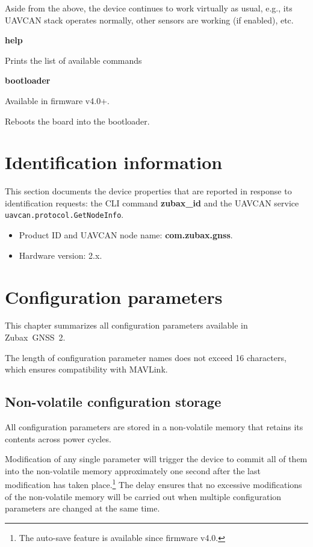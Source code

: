 \documentclass{zubaxdoc}
\begin{document}
Aside from the above, the device continues to work virtually as usual, e.g., its UAVCAN stack operates normally, other sensors are working (if enabled), etc.

\textbf{help}

Prints the list of available commands

\textbf{bootloader}

Available in firmware v4.0+.

Reboots the board into the bootloader.

\chapter{Identification information}

This section documents the device properties that are reported in response to identification requests: the CLI command \textbf{zubax{\_}id} and the UAVCAN service \texttt{uavcan.protocol.GetNodeInfo}.
\begin{itemize}
\item Product ID and UAVCAN node name: \textbf{com.zubax.gnss}.
\item Hardware version: 2.x.
\end{itemize}

\chapter{Configuration parameters}\label{sec:configuration_parameters}

This chapter summarizes all configuration parameters available in Zubax~GNSS~2.

The length of configuration parameter names does not exceed 16 characters,
which ensures compatibility with MAVLink.

\section{Non-volatile configuration storage}

All configuration parameters are stored in a non-volatile memory
that retains its contents across power cycles.

Modification of any single parameter will trigger the device to commit all of them into the non-volatile
memory approximately one second after the last modification has taken
place.\footnote{The auto-save feature is available since firmware v4.0.}
The delay ensures that no excessive modifications of the non-volatile memory will be carried out
when multiple configuration parameters are changed at the same time.
\end{document}
